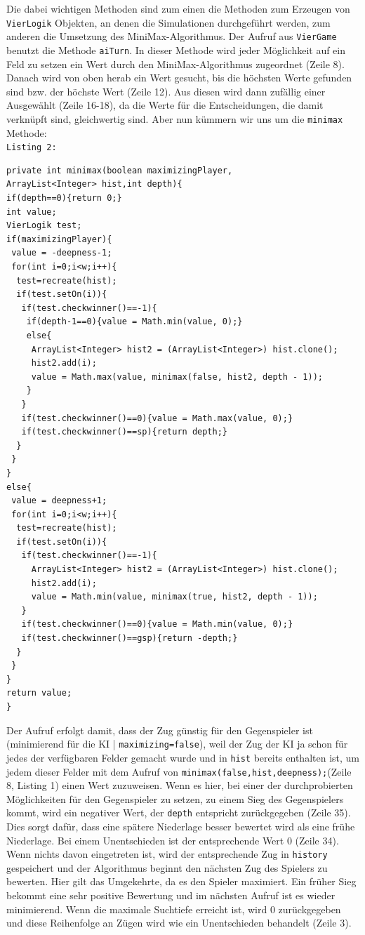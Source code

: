 \documentclass[12pt,a4paper]{article}
\def\code#1{\texttt{#1}}
\begin{document}
Die dabei wichtigen Methoden sind zum einen die Methoden zum Erzeugen von \code{VierLogik} Objekten, an denen die Simulationen durchgeführt werden, zum anderen die Umsetzung des MiniMax-Algorithmus. Der Aufruf aus \code{VierGame} benutzt die Methode \code{aiTurn}. In dieser Methode wird jeder Möglichkeit auf ein Feld zu setzen ein Wert durch den MiniMax-Algorithmus zugeordnet (Zeile 8). Danach wird von oben herab ein Wert gesucht, bis die höchsten Werte gefunden sind bzw. der höchste Wert (Zeile 12). Aus diesen wird dann zufällig einer Ausgewählt (Zeile 16-18), da die Werte für die Entscheidungen, die damit verknüpft sind, gleichwertig sind. Aber nun kümmern wir uns um die \code{minimax} Methode:\\
\code{Listing 2:}
\begin{lstlisting}
private int minimax(boolean maximizingPlayer, 
ArrayList<Integer> hist,int depth){
if(depth==0){return 0;}
int value;
VierLogik test;
if(maximizingPlayer){
 value = -deepness-1;
 for(int i=0;i<w;i++){
  test=recreate(hist);
  if(test.setOn(i)){
   if(test.checkwinner()==-1){
    if(depth-1==0){value = Math.min(value, 0);}
    else{
     ArrayList<Integer> hist2 = (ArrayList<Integer>) hist.clone();
     hist2.add(i);
     value = Math.max(value, minimax(false, hist2, depth - 1));
    }
   }
   if(test.checkwinner()==0){value = Math.max(value, 0);}
   if(test.checkwinner()==sp){return depth;}
  }
 }
}
else{
 value = deepness+1;
 for(int i=0;i<w;i++){
  test=recreate(hist);
  if(test.setOn(i)){
   if(test.checkwinner()==-1){
     ArrayList<Integer> hist2 = (ArrayList<Integer>) hist.clone();
     hist2.add(i);
     value = Math.min(value, minimax(true, hist2, depth - 1));
   }
   if(test.checkwinner()==0){value = Math.min(value, 0);}
   if(test.checkwinner()==gsp){return -depth;}
  }
 }
}
return value;
}
		\end{lstlisting}
	Der Aufruf erfolgt damit, dass der Zug günstig für den Gegenspieler ist (minimierend für die KI | \code{maximizing=false}), weil der Zug der KI ja schon für jedes der verfügbaren Felder gemacht wurde und in \code{hist} bereits enthalten ist, um jedem dieser Felder mit dem Aufruf von \code{minimax(false,hist,deepness);}(Zeile 8, Listing 1) einen Wert zuzuweisen. Wenn es hier, bei einer der durchprobierten Möglichkeiten für den Gegenspieler zu setzen, zu einem Sieg des Gegenspielers kommt, wird ein negativer Wert, der \code{depth} entspricht zurückgegeben (Zeile 35). Dies sorgt dafür, dass eine spätere Niederlage besser bewertet wird als eine frühe Niederlage. Bei einem Unentschieden ist der entsprechende Wert 0 (Zeile 34). Wenn nichts davon eingetreten ist, wird der entsprechende Zug in \code{history} gespeichert und der Algorithmus beginnt den nächsten Zug des Spielers zu bewerten. Hier gilt das Umgekehrte, da es den Spieler maximiert. Ein früher Sieg bekommt eine sehr positive Bewertung und im nächsten Aufruf ist es wieder minimierend. Wenn die maximale Suchtiefe erreicht ist, wird 0 zurückgegeben und diese Reihenfolge an Zügen wird wie ein Unentschieden behandelt (Zeile 3).
\end{document}
